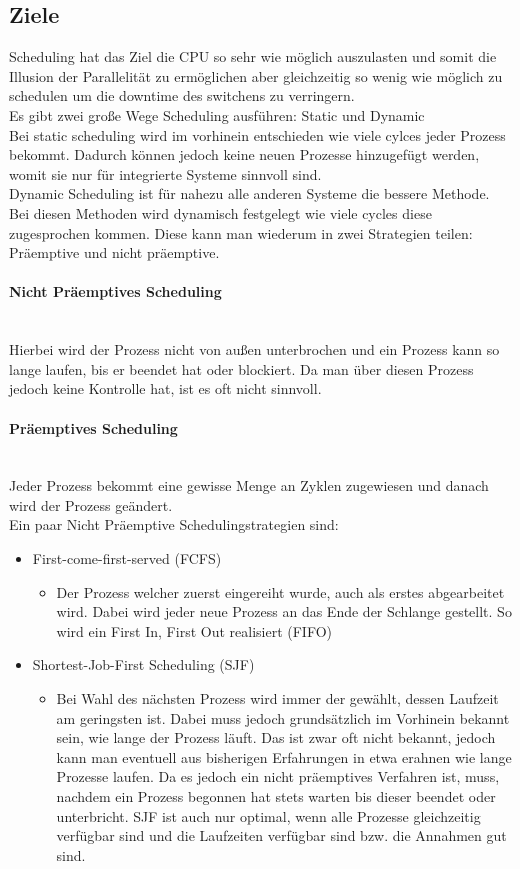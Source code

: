 \documentclass{article}
\newcommand{\paragraphlb}[1]{\paragraph{#1}\mbox{}\\}
\begin{document}
	\subsection{Ziele}
	Scheduling hat das Ziel die CPU so sehr wie möglich auszulasten und somit die Illusion der Parallelität zu ermöglichen aber gleichzeitig so wenig wie möglich zu schedulen um die downtime des switchens zu verringern. \\
	Es gibt zwei große Wege Scheduling ausführen: Static und Dynamic \\
	Bei static scheduling wird im vorhinein entschieden wie viele cylces jeder Prozess bekommt. Dadurch können jedoch keine neuen Prozesse hinzugefügt werden, womit sie nur für integrierte Systeme sinnvoll sind. \\
	Dynamic Scheduling ist für nahezu alle anderen Systeme die bessere Methode. Bei diesen Methoden wird dynamisch festgelegt wie viele cycles diese zugesprochen kommen. Diese kann man wiederum in zwei Strategien teilen: Präemptive und nicht präemptive. \\
	\paragraphlb{Nicht Präemptives Scheduling}
	Hierbei wird der Prozess nicht von außen unterbrochen und ein Prozess kann so lange laufen, bis er beendet hat oder blockiert. Da man über diesen Prozess jedoch keine Kontrolle hat, ist es oft nicht sinnvoll.
	\paragraphlb{Präemptives Scheduling}
	Jeder Prozess bekommt eine gewisse Menge an Zyklen zugewiesen und danach wird der Prozess geändert. \\
	Ein paar Nicht Präemptive Schedulingstrategien sind:
	\begin{itemize}
		\item{First-come-first-served (FCFS)}
		\begin{itemize}
			\item{Der Prozess welcher zuerst eingereiht wurde, auch als erstes abgearbeitet wird. Dabei wird jeder neue Prozess an das Ende der Schlange gestellt. So wird ein First In, First Out realisiert (FIFO)}
		\end{itemize}
		\item{Shortest-Job-First Scheduling (SJF)}
		\begin{itemize}
			\item{Bei Wahl des nächsten Prozess wird immer der gewählt, dessen Laufzeit am geringsten ist. Dabei muss jedoch grundsätzlich im Vorhinein bekannt sein, wie lange der Prozess läuft. Das ist zwar oft nicht bekannt, jedoch kann man eventuell aus bisherigen Erfahrungen in etwa erahnen wie lange Prozesse laufen. Da es jedoch ein nicht präemptives Verfahren ist, muss, nachdem ein Prozess begonnen hat stets warten bis dieser beendet oder unterbricht. SJF ist auch nur optimal, wenn alle Prozesse gleichzeitig verfügbar sind und die Laufzeiten verfügbar sind bzw. die Annahmen gut sind.}
		\end{itemize}
	\end{itemize}
\end{document}

